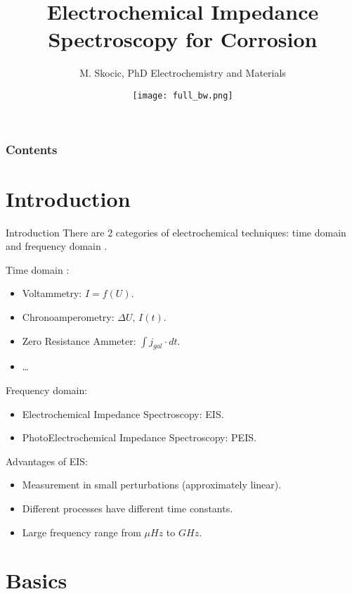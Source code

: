 \documentclass[10pt,compress,handout]{beamer}
\title{Electrochemical Impedance Spectroscopy for Corrosion}
\author{M. Skocic, PhD Electrochemistry and Materials}
\date{\vfill \texttt{[image: full\_bw.png]}}
\begin{document}
    \begin{frame}
        \titlepage
    \end{frame}

    \begin{frame}
        \frametitle{Contents}
        \tableofcontents
    \end{frame}
    
\section{Introduction}
    \begin{frame}{Introduction}
        There are 2 categories of electrochemical techniques: 
        time domain and frequency domain \citep{bard2001}.

        Time domain :
        \begin{itemize}
            \item Voltammetry: $I=f(U)$.
            \item Chronoamperometry: $\Delta U$, $I(t)$.
            \item Zero Resistance Ammeter: $\int j_{gal} \cdot dt$.
            \item \ldots
        \end{itemize}

        Frequency domain:
        \begin{itemize}
            \item Electrochemical Impedance Spectroscopy: EIS.
            \item PhotoElectrochemical Impedance Spectroscopy: PEIS.
        \end{itemize}

        Advantages of EIS:
        \begin{itemize}
            \item Measurement in small perturbations (approximately linear).
            \item Different processes have different time constants.
            \item Large frequency range from $\mu Hz$ to $GHz$.
        \end{itemize}
    \end{frame}

\section{Basics}
\end{document}
